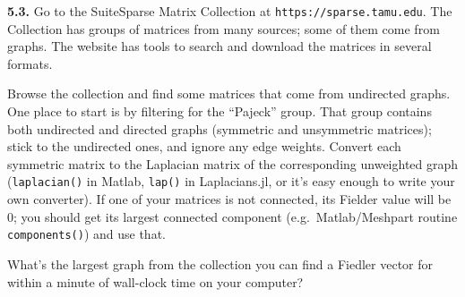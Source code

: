 \documentclass[11pt]{article}
\begin{document}
\par\bigskip
{\bf 5.3.} 
Go to the SuiteSparse Matrix Collection at {\tt https://sparse.tamu.edu}.
The Collection has groups of matrices from many sources;
some of them come from graphs.
The website has tools to search and download the matrices in several formats.

Browse the collection and find some matrices that come from undirected graphs. 
One place to start is by filtering for the ``Pajeck'' group.
That group contains both undirected and directed graphs 
(symmetric and unsymmetric matrices); 
stick to the undirected ones, and ignore any edge weights. 
Convert each symmetric matrix to the Laplacian matrix of the 
corresponding unweighted graph
({\tt laplacian()} in Matlab, {\tt lap()} in Laplacians.jl,
or it's easy enough to write your own converter).
If one of your matrices is not connected, its Fielder value will be 0;
you should get its largest connected component 
(e.g.\ Matlab/Meshpart routine {\tt components()}) and use that.

What's the largest graph from the collection you can find a Fiedler vector 
for within a minute of wall-clock time on your computer?
\end{document}
